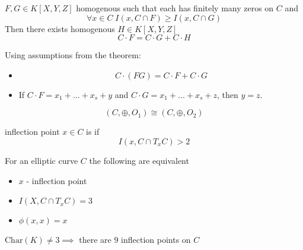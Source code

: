 \documentclass[twoside, a4paper, 12pt]{book}
\begin{document}
\begin{theorem}{}{}
  $F,G\in K[X,Y,Z]$ homogenous such that each has finitely many zeros on $C$ and
  $$\forall x\in C\;I(x, C\cap F)\geq I(x, C\cap G)$$
  Then there exists homogenous $H\in K[X,Y,Z]$ 
  $$C\cdot F=C\cdot G+C\cdot H$$
\end{theorem}

Using assumptions from the theorem:
\begin{itemize}
  \item $$C\cdot(FG)=C\cdot F+C\cdot G$$
  \item If $C\cdot F=x_1+...+x_s+y$ and $C\cdot G=x_1+...+x_s+z$, then $y=z$.
\end{itemize}

\begin{theorem}{}{}
  $$(C, \oplus, O_1)\cong (C, \oplus, O_2)$$
\end{theorem}

\begin{definition}{inflection point}{}
  $x\in C$ is  if
  $$I(x, C\cap T_xC)>2$$
\end{definition}

For an elliptic curve $C$ the following are equivalent
\begin{itemize}
  \item $x$ - inflection point
  \item $I(X, C\cap T_xC)=3$
  \item $\phi(x,x)=x$
\end{itemize}

$\text{Char}(K)\neq 3\implies $ there are $9$ inflection points on $C$
\end{document}

